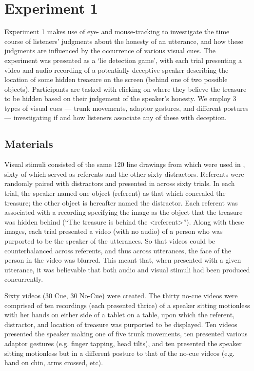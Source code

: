 \documentclass[a4paper,man,natbib]{apa6}
\begin{document}
\section{Experiment 1}
Experiment 1 makes use of eye- and mouse-tracking to investigate the time course of listeners' judgments about the honesty of an utterance, and how these judgments are influenced by the occurrence of various visual cues. 
The experiment was presented as a `lie detection game', with each trial presenting a video and audio recording of a potentially deceptive speaker describing the location of some hidden treasure on the screen (behind one of two possible objects). 
Participants are tasked with clicking on where they believe the treasure to be hidden based on their judgement of the speaker's honesty.
We employ 3 types of visual cues --- trunk movements, adaptor gestures, and different postures --- investigating if and how listeners associate any of these with deception.



\subsection{Materials}
Visual stimuli consisted of the same 120 line drawings from \citet{Snodgrass1980} which were used in \citet{Loy2017}, sixty of which served as referents and the other sixty distractors.
Referents were randomly paired with distractors and presented in across sixty trials. 
In each trial, the speaker named one object (referent) as that which concealed the treasure; the other object is hereafter named the distractor.
Each referent was associated with a recording specifying the image as the object that the treasure was hidden behind (``The treasure is behind the <referent>'').
Along with these images, each trial presented a video (with no audio) of a person who was purported to be the speaker of the utterances. 
So that videos could be counterbalanced across referents, and thus across utterances, the face of the person in the video was blurred. 
This meant that, when presented with a given utterance, it was believable that both audio and visual stimuli had been produced concurrently. 

Sixty videos (30 Cue, 30 No-Cue) were created. 
The thirty no-cue videos were comprised of ten recordings (each presented thrice) of a speaker sitting motionless with her hands on either side of a tablet on a table, upon which the referent, distractor, and location of treasure was purported to be displayed.
Ten videos presented the speaker making one of five trunk movements, ten presented various adaptor gestures (e.g. finger tapping, head tilts), and ten presented the speaker sitting motionless but in a different posture to that of the no-cue videos (e.g. hand on chin, arms crossed, etc).
\end{document}
